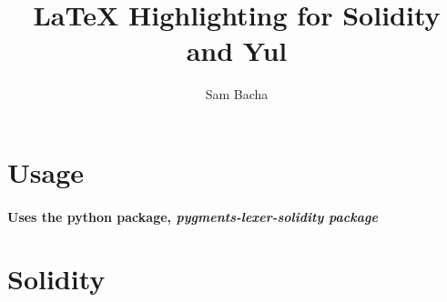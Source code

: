\documentclass[runningheads]{llncs}
\title{ \LaTeX{} Highlighting for Solidity and Yul}
\begin{document}
\author{Sam Bacha}
%
%

\maketitle
\section{Usage}
\paragraph{Uses the python package, \em{pygments-lexer-solidity} package }

\section{Solidity}
\end{document}
